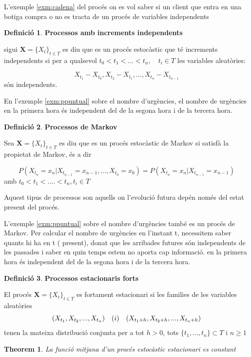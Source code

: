 \documentclass[
  catalan,
]{article}
\newtheorem{theorem}{Theorem}[section]
\theoremstyle{definition}
\newtheorem{definition}{Definició}[section]
\theoremstyle{definition}
\theoremstyle{definition}
\theoremstyle{definition}
\theoremstyle{remark}
\begin{document}
L'exemple \ref{exm:cadena} del procés on es vol saber si un client que entra en una botiga compra o no es tracta de un procés de variables independents

\begin{definition}
\textbf{Processos amb increments independents}

sigui \(\textbf{X}=\{X_t\}_{t \in T}\) es diu que es un procés estocàstic que té increments independents si per a qualsevol \(t_0<t_1<...<t_n,\quad t_i \in T\) les variables aleatòries:

\[
X_{t_1}-X_{t_0},X_{t_2}-X_{t_1},...,X_{t_n}-X_{t_{n-1}}
 \]
són independents.
\end{definition}

En l'exemple \ref{exm:ppuntual} sobre el nombre d'urgències, el nombre de urgències en la primera hora és independent del de la segona hora i de la tercera hora.

\begin{definition}
\textbf{Processos de Markov}

Sea \(\textbf{X}=\{X_t\}_{t \in T}\) es diu que es un procés estocàstic de Markov si satisfà la propietat de Markov, és a dir

\[
P(X_{t_n}=x_n|X_{t_{n-1}}=x_{n-1},...,X_{t_0}=x_0)=P(X_{t_n}=x_n|X_{t_{n-1}}=x_{n-1})
\]
amb \(t_0<t_1<....<t_n, t_i \in T\)
\end{definition}

Aquest tipus de processos son aquells on l'evolució futura depén només del estat present del procés.

L'exemple \ref{exm:ppuntual} sobre el nombre d'urgències també es un procés de Markov. Per calcular el nombre de urgències en l'instant t, necessitem saber quants hi ha en t ( present), donat que les arribades futures són independents de les passades i saber en quin temps estem no aporta cap informació. en la primera hora és independent del de la segona hora i de la tercera hora.

\begin{definition}
\textbf{Processos estacionaris forts}

El procés \(\textbf{X}=\{X_t\}_{t \in T}\) es fortament estacionari si les families de les variables aleatòries
\[
(X_{t_1},X_{t_2},...,X_{t_n}) \quad \text(i) \quad (X_{t_1+h},X_{t_2+h},...,X_{t_n+h})
\]
tenen la mateixa distribució conjunta per a tot \(h>0\), tots \(\{t_1,...,t_n\} \subset T\) i \(n\geq 1\)
\end{definition}

\begin{theorem}
La funció mitjana d'un procés estocàstic estacionari es constant
\end{theorem}
\end{document}
